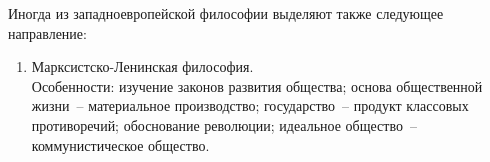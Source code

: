 Иногда из западноевропейской философии выделяют также следующее направление:
\begin{enumerate}
    \item Марксистско-Ленинская философия.\\
        Особенности: изучение законов развития общества;
        основа общественной жизни~-- материальное производство;
        государство~-- продукт классовых противоречий;
        обоснование революции;
        идеальное общество~-- коммунистическое общество.
\end{enumerate}
